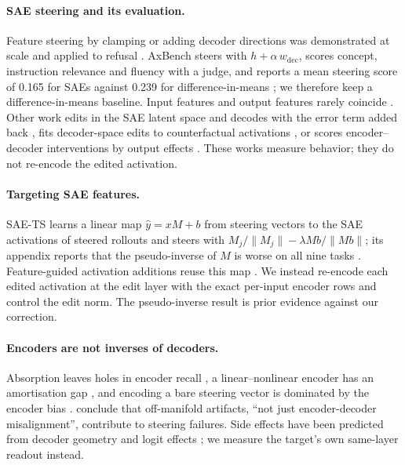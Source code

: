 \documentclass{article}
\theoremstyle{plain}
\theoremstyle{definition}
\theoremstyle{remark}
\begin{document}
\paragraph{SAE steering and its evaluation.}
Feature steering by clamping or adding decoder directions was demonstrated at scale
\citep{templeton2024scaling} and applied to refusal \citep{obrien2025steering}. AxBench
steers with $h + \alpha\, w_{\mathrm{dec}}$, scores concept, instruction relevance and
fluency with a judge, and reports a mean steering score of 0.165 for SAEs against 0.239 for
difference-in-means \citep{wu2025axbench}; we therefore keep a difference-in-means baseline.
Input features and output features rarely coincide \citep{arad2025saes}. Other work edits in
the SAE latent space and decodes with the error term added back \citep{bayat2025steering},
fits decoder-space edits to counterfactual activations \citep{makelov2024towards}, or scores
encoder--decoder interventions by output effects \citep{bhalla2025towards}. These works
measure behavior; they do not re-encode the edited activation.

\paragraph{Targeting SAE features.}
SAE-TS learns a linear map $\hat y = xM + b$ from steering vectors to the SAE activations of
steered rollouts and steers with $M_j/\|M_j\| - \lambda Mb/\|Mb\|$; its appendix reports that
the pseudo-inverse of $M$ is worse on all nine tasks \citep{chalnev2024improving}.
Feature-guided activation additions reuse this map \citep{soo2025interpretable}. We instead
re-encode each edited activation at the edit layer with the exact per-input encoder rows and
control the edit norm. The pseudo-inverse result is prior evidence against our correction.

\paragraph{Encoders are not inverses of decoders.}
Absorption leaves holes in encoder recall \citep{chanin2025absorption}, a linear--nonlinear
encoder has an amortisation gap \citep{oneill2025compute}, and encoding a bare steering
vector is dominated by the encoder bias \citep{mayne2024can}. \citet{luo2026learning}
conclude that off-manifold artifacts, ``not just encoder-decoder misalignment'', contribute
to steering failures. Side effects have been predicted from decoder geometry and logit
effects \citep{duan2026preintervention,khan2026look}; we measure the target's own same-layer
readout instead.
\end{document}

